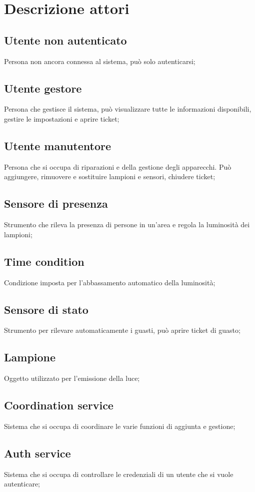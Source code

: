 \chapter{Descrizione attori}
    \section{Utente non autenticato} 
    Persona non ancora connessa al sistema, può solo autenticarsi;
    
    \section{Utente gestore} 
    Persona che gestisce il sistema, può visualizzare tutte le informazioni disponibili, gestire le impostazioni e aprire ticket;
    
    \section{Utente manutentore} 
    Persona che si occupa di riparazioni e della gestione degli apparecchi. Può aggiungere, rimuovere e sostituire lampioni e sensori, chiudere ticket;
    
    \section{Sensore di presenza} 
    Strumento che rileva la presenza di persone in un'area e regola la luminosità dei lampioni;
    
    \section{Time condition}
    Condizione imposta per l'abbassamento automatico della luminosità;
    
    \section{Sensore di stato} 
    Strumento per rilevare automaticamente i guasti, può aprire ticket di guasto;
    
    \section{Lampione} 
    Oggetto utilizzato per l'emissione della luce;
    
    \section{Coordination service} 
    Sistema che si occupa di coordinare le varie funzioni di aggiunta e gestione;
    
    \section{Auth service} 
    Sistema che si occupa di controllare le credenziali di un utente che si vuole autenticare;
